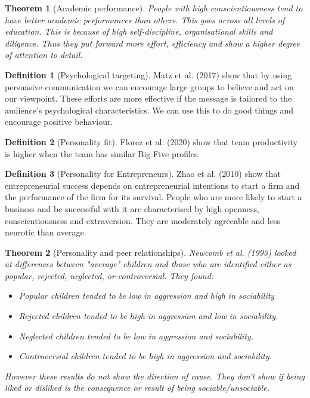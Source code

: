 \documentclass{article}
\newtheorem{theorem}{Theorem}
\theoremstyle{definition}
\newtheorem{definition}{Definition}
\theoremstyle{Solution}
\begin{document}
\begin{theorem}[Academic performance]
People with high conscientiousness tend to have better academic performances than others. This goes across all levels of education. This is because of high self-discipline, organisational skills and diligence. Thus they put forward more effort, efficiency and show a higher degree of attention to detail.
\end{theorem}

\begin{definition}[Psychological targeting]
Matz et al. (2017) show that by using persuasive communication we can encourage large groups to believe and act on our viewpoint. These efforts are more effective if the message is tailored to the audience's psychological characteristics. We can use this to do good things and encourage positive behaviour.
\end{definition}

\begin{definition}[Personality fit]
Florez et al. (2020) show that team productivity is higher when the team has similar Big Five profiles.
\end{definition}

\begin{definition}[Personality for Entrepreneurs]
Zhao et al. (2010) show that entrepreneurial success depends on entrepreneurial intentions to start a firm and the performance of the firm for its survival. People who are more likely to start a business and be successful with it are characterised by high openness, conscientiousness and extraversion. They are moderately agreeable and less neurotic than average.
\end{definition}

\begin{theorem}[Personality and peer relationships]
Newcomb et al. (1993) looked at differences between \textit{"average"} children and those who are identified either as \textit{popular, rejected, neglected, or controversial}. They found:
\begin{itemize}
	\item[(a):] Popular children tended to be low in aggression and high in sociability
	\item[(b):] Rejected children tended to be high in aggression and low in sociability.
	\item[(c):] Neglected children tended to be low in aggression and sociability.
	\item[(d):] Controversial children tended to be high in aggression and sociability.
\end{itemize}
However these results do not show the direction of cause. They don't show if being liked or disliked is the consequence or result of being sociable/unsociable.
\end{theorem}
\end{document}
